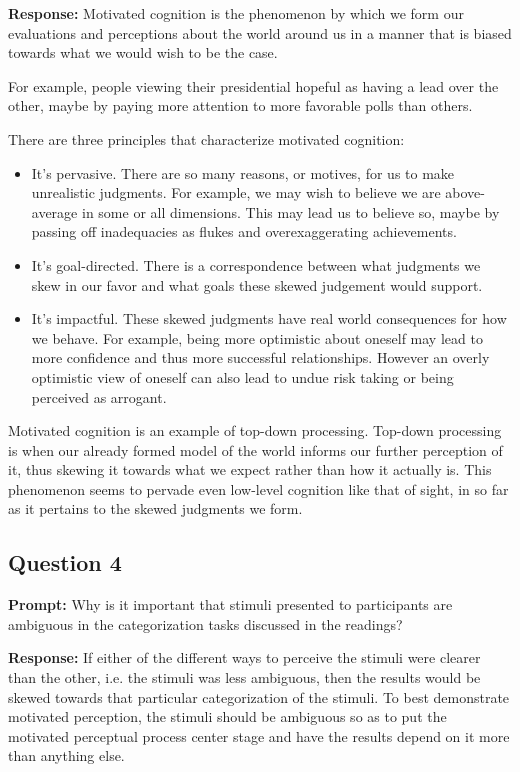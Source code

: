 \documentclass{article}
\begin{document}
\noindent\textbf{Response:} Motivated cognition is the phenomenon by which we form our evaluations and perceptions about the world around us in a manner that is biased towards what we would wish to be the case.

For example, people viewing their presidential hopeful as having a lead over the other, maybe by paying more attention to more favorable polls than others.

There are three principles that characterize motivated cognition:
\begin{itemize}
	\item It's pervasive. There are so many reasons, or motives, for us to make unrealistic judgments. For example, we may wish to believe we are above-average in some or all dimensions. This may lead us to believe so, maybe by passing off inadequacies as flukes and overexaggerating achievements. 
	\item It's goal-directed. There is a correspondence between what judgments we skew in our favor and what goals these skewed judgement would support.
	\item It's impactful. These skewed judgments have real world consequences for how we behave. For example, being more optimistic about oneself may lead to more confidence and thus more successful relationships. However an overly optimistic view of oneself can also lead to undue risk taking or being perceived as arrogant.
\end{itemize}

Motivated cognition is an example of top-down processing. Top-down processing is when our already formed model of the world informs our further perception of it, thus skewing it towards what we expect rather than how it actually is. This phenomenon seems to pervade even low-level cognition like that of sight, in so far as it pertains to the skewed judgments we form.

\subsection*{Question 4}
\noindent\textbf{Prompt:} Why is it important that stimuli presented to participants are ambiguous in the categorization tasks discussed in the readings?
\bigskip

\noindent\textbf{Response:} If either of the different ways to perceive the stimuli were clearer than the other, i.e. the stimuli was less ambiguous, then the results would be skewed towards that particular categorization of the stimuli. To best demonstrate motivated perception, the stimuli should be ambiguous so as to put the motivated perceptual process center stage and have the results depend on it more than anything else. 
\end{document}
